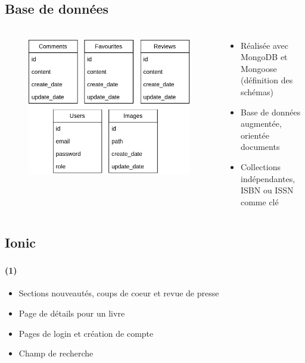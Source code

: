 \documentclass[10pt]{beamer}
\begin{document}
\subsection{Base de données}
\begin{frame}
	\frametitle{\secname}
	\framesubtitle{\subsecname}
	\begin{columns}[T]
		\begin{column}{.5\textwidth}
            \begin{figure}
                \includegraphics[width=1\textwidth]{images/bdd.png}
            \end{figure}
		\end{column}
		\begin{column}{.5\textwidth}
            \begin{itemize}
                \item Réalisée avec MongoDB et Mongoose (définition des schémas)
                \item Base de données augmentée, orientée documents
                \item Collections indépendantes, ISBN ou ISSN comme clé
            \end{itemize}
		\end{column}
	\end{columns}
\end{frame}

\subsection{Ionic}
\begin{frame}
	\frametitle{\secname}
	\framesubtitle{\subsecname (1)}
    \begin{itemize}
        \item Sections nouveautés, coups de coeur et revue de presse
        \item Page de détails pour un livre
        \item Pages de login et création de compte
        \item Champ de recherche
    \end{itemize}
\end{frame}
\end{document}
